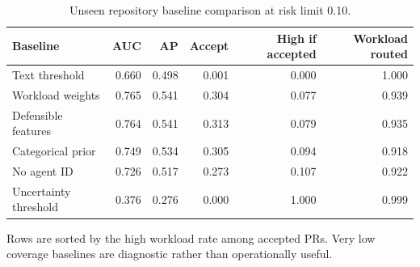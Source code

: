 \begin{table}[t]
\centering
\scriptsize
\caption{Unseen repository baseline comparison at risk limit 0.10.}
\label{tab:aidev-baselines}
\begin{tabular}{lrrrrr}
\toprule
Baseline & AUC & AP & Accept & High if accepted & Workload routed \\
\midrule
Text threshold & 0.660 & 0.498 & 0.001 & 0.000 & 1.000 \\
Workload weights & 0.765 & 0.541 & 0.304 & 0.077 & 0.939 \\
Defensible features & 0.764 & 0.541 & 0.313 & 0.079 & 0.935 \\
Categorical prior & 0.749 & 0.534 & 0.305 & 0.094 & 0.918 \\
No agent ID & 0.726 & 0.517 & 0.273 & 0.107 & 0.922 \\
Uncertainty threshold & 0.376 & 0.276 & 0.000 & 1.000 & 0.999 \\
\bottomrule
\end{tabular}
\par\footnotesize{Rows are sorted by the high workload rate among accepted PRs. Very low coverage baselines are diagnostic rather than operationally useful.}
\end{table}
